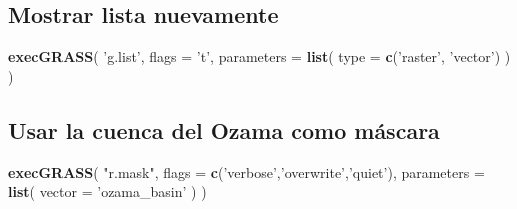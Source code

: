 \documentclass[11pt,]{article}
\newenvironment{Shaded}{\begin{snugshade}}{\end{snugshade}}
\newcommand{\KeywordTok}[1]{\textcolor[rgb]{0.13,0.29,0.53}{\textbf{#1}}}
\newcommand{\DataTypeTok}[1]{\textcolor[rgb]{0.13,0.29,0.53}{#1}}
\newcommand{\StringTok}[1]{\textcolor[rgb]{0.31,0.60,0.02}{#1}}
\newcommand{\OtherTok}[1]{\textcolor[rgb]{0.56,0.35,0.01}{#1}}
\newcommand{\OperatorTok}[1]{\textcolor[rgb]{0.81,0.36,0.00}{\textbf{#1}}}
\newcommand{\NormalTok}[1]{#1}
\begin{document}
\begin{Shaded}
\end{Shaded}

\begin{Shaded}
\end{Shaded}

\subsection{Mostrar lista nuevamente}\label{mostrar-lista-nuevamente}

\begin{Shaded}
\begin{Highlighting}[]
\KeywordTok{execGRASS}\NormalTok{(}
  \StringTok{'g.list'}\NormalTok{,}
  \DataTypeTok{flags =} \StringTok{'t'}\NormalTok{,}
  \DataTypeTok{parameters =} \KeywordTok{list}\NormalTok{(}
    \DataTypeTok{type =} \KeywordTok{c}\NormalTok{(}\StringTok{'raster'}\NormalTok{, }\StringTok{'vector'}\NormalTok{)}
\NormalTok{  )}
\NormalTok{)}
\end{Highlighting}
\end{Shaded}

\subsection{Usar la cuenca del Ozama como
máscara}\label{usar-la-cuenca-del-ozama-como-muxe1scara}

\begin{Shaded}
\begin{Highlighting}[]
\KeywordTok{execGRASS}\NormalTok{(}
  \StringTok{"r.mask"}\NormalTok{,}
  \DataTypeTok{flags =} \KeywordTok{c}\NormalTok{(}\StringTok{'verbose'}\NormalTok{,}\StringTok{'overwrite'}\NormalTok{,}\StringTok{'quiet'}\NormalTok{),}
  \DataTypeTok{parameters =} \KeywordTok{list}\NormalTok{(}
    \DataTypeTok{vector =} \StringTok{'ozama_basin'}
\NormalTok{  )}
\NormalTok{)}
\end{Highlighting}
\end{Shaded}
\end{document}
